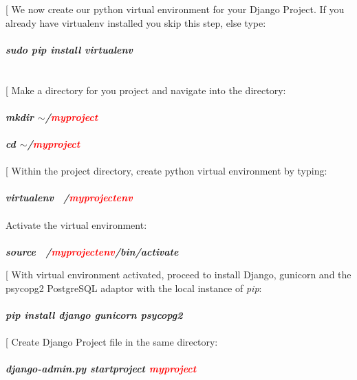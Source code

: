 \documentclass[a4paper]{article}
\makeatletter
\def\step{%
	\@ifnextchar[ \@myitem{\@noitemargtrue\@myitem[\@itemlabel]}}
\def\@myitem[#1]{\item[#1]\mbox{}\\}
\newenvironment{Step}{%
	\begin{enumerate}[label= \textbf {Step} \arabic*,align=left, leftmargin=1.0cm]%
	}{
\end{enumerate}%
}
\makeatother
\begin{document}
\begin{Step}
\step
We now create our python virtual environment for your Django Project. If you already have virtualenv installed you skip this step, else type:\\ \\
\textbf{\emph{sudo pip install virtualenv}}\\ \\ \\

\step
Make a directory for you project and navigate into the directory:\\ \\
\textbf{\emph{mkdir $\sim$/\textcolor{red}{myproject}}}\\ \\
\textbf{\emph{cd $\sim$/\textcolor{red}{myproject}}}\\ \\

\step
Within the project directory, create python virtual environment by typing:\\ \\
\textbf{\emph{virtualenv ~/\textcolor{red}{myprojectenv}}}\\ \\
Activate the virtual environment:\\ \\
\textbf{\emph{source ~/\textcolor{red}{myprojectenv}/bin/activate}}

\step
With virtual environment activated, proceed to install Django, gunicorn and the psycopg2 PostgreSQL adaptor with the local instance of \textit{pip}:\\ \\
\textbf{\emph{pip install django gunicorn psycopg2}}\\ \\

\step
Create Django Project file in the same directory:\\ \\
\textbf{\emph{django-admin.py startproject \textcolor{red}{myproject}}}\\ \\


\end{Step}
\end{document}
